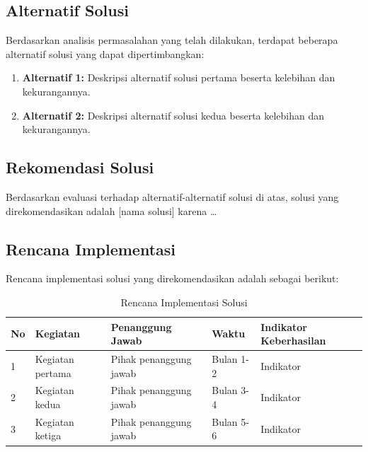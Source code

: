 \subsection{Alternatif Solusi}
\label{subsec:alternatif-solusi}

Berdasarkan analisis permasalahan yang telah dilakukan, terdapat beberapa alternatif
solusi yang dapat dipertimbangkan:

\begin{enumerate}
  \item \textbf{Alternatif 1:} Deskripsi alternatif solusi pertama beserta kelebihan
        dan kekurangannya.
  \item \textbf{Alternatif 2:} Deskripsi alternatif solusi kedua beserta kelebihan
        dan kekurangannya.
\end{enumerate}

\subsection{Rekomendasi Solusi}
\label{subsec:rekomendasi}

Berdasarkan evaluasi terhadap alternatif-alternatif solusi di atas, solusi yang
direkomendasikan adalah [nama solusi] karena \ldots

\subsection{Rencana Implementasi}
\label{subsec:rencana-implementasi}

Rencana implementasi solusi yang direkomendasikan adalah sebagai berikut:

\begin{table}[H]
\caption{Rencana Implementasi Solusi}
\label{tab:rencana-implementasi}
\begin{isitable}
\begin{tabular}{p{0.5cm} p{5cm} p{3cm} p{3cm} p{3cm}}
\toprule
\textbf{No} & \textbf{Kegiatan} & \textbf{Penanggung Jawab} & \textbf{Waktu} & \textbf{Indikator Keberhasilan} \\
\midrule
1 & Kegiatan pertama & Pihak penanggung jawab & Bulan 1-2 & Indikator \\
2 & Kegiatan kedua & Pihak penanggung jawab & Bulan 3-4 & Indikator \\
3 & Kegiatan ketiga & Pihak penanggung jawab & Bulan 5-6 & Indikator \\
\bottomrule
\end{tabular}
\end{isitable}
\end{table}


